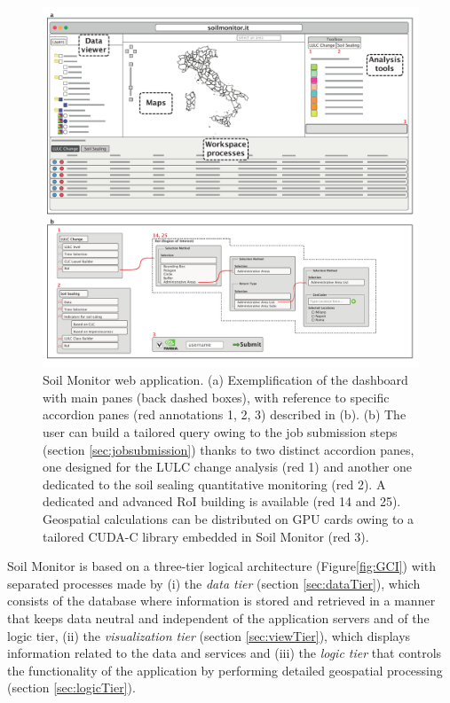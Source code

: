 \documentclass[APA,LATO1COL,doublespace]{WileyNJD-v2}
\begin{document}
\begin{figure}[t] %
    \centerline{\includegraphics[width=500pt]{daMileti/01_piattaforma.pdf}}
    \caption{Soil Monitor web application.
             (a) Exemplification of the dashboard with main panes (back dashed boxes), with reference to specific accordion panes (red annotations 1, 2, 3) described in (b). 
             (b) The user can build a tailored query owing to the job submission steps (section \ref{sec:jobsubmission}) thanks to two distinct accordion panes, one designed for the LULC change analysis (red 1) and another one dedicated to the soil sealing quantitative monitoring (red 2). A dedicated and advanced RoI building is available (red 14 and 25). Geospatial calculations can be distributed on GPU cards owing to a tailored CUDA-C library embedded in Soil Monitor (red 3). } \label{fig:SMapp}
\end{figure}

Soil Monitor is based on a three-tier logical architecture (Figure\ref{fig:GCI}) with separated processes made by 
(i) 
the \textit{data tier} (section \ref{sec:dataTier}), which consists of the database where information is stored and retrieved in a manner that keeps data neutral and independent of the application servers and of the logic tier,
(ii) the \textit{visualization tier} (section \ref{sec:viewTier}), which displays information related to the data and services
and 
(iii) 
the \textit{logic tier} that controls the functionality of the application by performing detailed geospatial processing (section \ref{sec:logicTier}).
\end{document}
